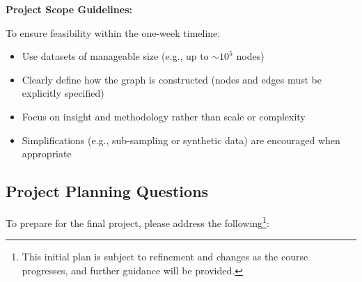\documentclass{article}
\begin{document}
\vspace{0.5em}

\noindent\textbf{Project Scope Guidelines:}

To ensure feasibility within the one-week timeline:
\begin{itemize}[leftmargin=1.5em]
    \item Use datasets of manageable size (e.g., up to $\sim\!10^5$ nodes)
    \item Clearly define how the graph is constructed (nodes and edges must be explicitly specified)
    \item Focus on insight and methodology rather than scale or complexity
    \item Simplifications (e.g., sub-sampling or synthetic data) are encouraged when appropriate
\end{itemize}

\subsection*{Project Planning Questions}

To prepare for the final project, please address the following\footnote{This initial plan is subject to refinement and changes as the course progresses, and further guidance will be provided.}:
\end{document}
